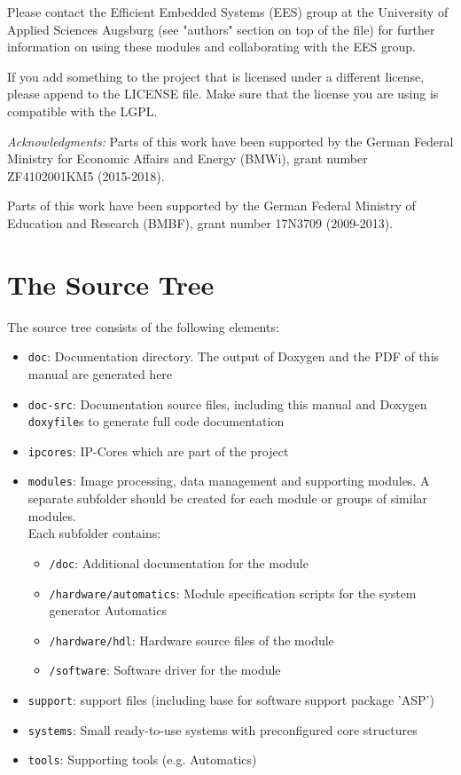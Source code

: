 Please contact the Efficient Embedded Systems (EES) group at the University of
Applied Sciences Augsburg (see "authors" section on top of the file) for
further information on using these modules and collaborating with the EES group.

If you add something to the project that is licensed under a different license, please append to the LICENSE file.
Make sure that the license you are using is compatible with the LGPL.

\bigskip

\textit{Acknowledgments:}\linebreak
Parts of this work have been supported by the German Federal Ministry for
Economic Affairs and Energy (BMWi), grant number ZF4102001KM5 (2015-2018).

Parts of this work have been supported by the German Federal Ministry of
Education and Research (BMBF), grant number 17N3709 (2009-2013).

\section{The \asterics Source Tree}
\label{sec:02-file_structure}
The \asterics source tree consists of the following elements:
\begin{itemize}
  \item \texttt{doc}: Documentation directory. The output of Doxygen and the PDF of this manual are generated here
  \item \texttt{doc-src}: Documentation source files, including this manual and Doxygen \texttt{doxyfile}s to generate full code documentation 
  \item \texttt{ipcores}: IP-Cores which are part of the \asterics project
  \item \texttt{modules}: Image processing, data management and supporting modules. A separate subfolder should be created for each module or groups of similar modules.\\
  Each subfolder contains: 
  \begin{itemize}
  	\item \texttt{/doc}: Additional documentation for the module
  	\item \texttt{/hardware/automatics}: Module specification scripts for the system generator Automatics 
  	\item \texttt{/hardware/hdl}: Hardware source files of the module
  	\item \texttt{/software}: Software driver for the module
  \end{itemize}
  
  \item \texttt{support}: \asterics support files (including base for \asterics software support package 'ASP')
  \item \texttt{systems}: Small ready-to-use systems with preconfigured core structures
  \item \texttt{tools}: Supporting tools (e.g. Automatics)
\end{itemize}

